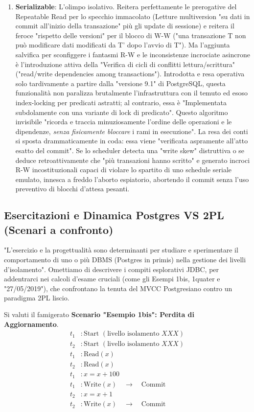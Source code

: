 \begin{enumerate}
    \item \textbf{Serializable}:
    L'olimpo isolativo. Reitera perfettamente le prerogative del Repeatable Read per lo specchio immacolato (Letture multiversion "su dati in commit all'inizio della transazione" più gli update di sessione) e reitera il feroce "rispetto delle versioni" per il blocco di W-W ("una transazione T non può modificare dati modificati da T' dopo l'avvio di T").
    Ma l'aggiunta salvifica per sconfiggere i fantasmi R-W e le inconsistenze incrociate asincrone è l'introduzione attiva della "Verifica di cicli di conflitti lettura/scrittura" ("read/write dependencies among transactions").
    Introdotta e resa operativa solo tardivamente a partire dalla "versione 9.1" di PostgreSQL, questa funzionalità non paralizza brutalmente l'infrastruttura con il temuto ed esoso index-locking per predicati astratti; al contrario, essa è "Implementata subdolamente con una variante di lock di predicato". Questo algoritmo invisibile "ricorda e traccia minuziosamente l'ordine delle operazioni e le dipendenze, \textit{senza fisicamente bloccare} i rami in esecuzione". La resa dei conti si sposta drammaticamente in coda: essa viene "verificata aspramente all'atto esatto del commit". Se lo scheduler detecta una "write skew" distruttiva o se deduce retroattivamente che "più transazioni hanno scritto" e generato incroci R-W incostituzionali capaci di violare lo spartito di uno schedule seriale emulato, innesca a freddo l'aborto espiatorio, abortendo il commit senza l'uso preventivo di blocchi d'attesa pesanti.
\end{enumerate}

\subsection{Esercitazioni e Dinamica Postgres VS 2PL (Scenari a confronto)}

"L'esercizio e la progettualità sono determinanti per studiare e sperimentare il comportamento di uno o più DBMS (Postgres in primis) nella gestione dei livelli d'isolamento". Omettiamo di descrivere i compiti esplorativi JDBC, per addentrarci nei calcoli d'esame cruciali (come gli Esempi 1bis, 1quater e "27/05/2019"), che confrontano la tenuta del MVCC Postgresiano contro un paradigma 2PL liscio.

Si valuti il famigerato \textbf{Scenario "Esempio 1bis": Perdita di Aggiornamento}.
\begin{align*}
    t_1&: \text{Start } (\text{livello isolamento } XXX) \\
    t_2&: \text{Start } (\text{livello isolamento } XXX) \\
    t_1&: \text{Read}(x) \\
    t_2&: \text{Read}(x) \\
    t_1&: x = x + 100 \\
    t_1&: \text{Write}(x) \quad \rightarrow \quad \text{Commit} \\
    t_2&: x = x + 1 \\
    t_2&: \text{Write}(x) \quad \rightarrow \quad \text{Commit}
\end{align*}


